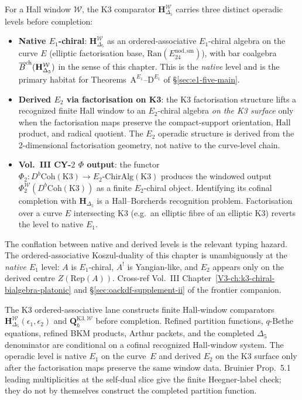 \begin{remark}
\label{rem:v2-oackd-eone-etwo-scope}
For a Hall window $\mathcal W$, the K3 comparator
$\mathbf H_{\Delta_5}^{\mathcal W}$ carries three distinct operadic
levels before completion:
\begin{itemize}
\item \textbf{Native $E_1$-chiral}: $\mathbf H_{\Delta_5}^{\mathcal W}$ as an
 ordered-associative $E_1$-chiral algebra on the curve $E$ (elliptic
 factorisation base, $\mathrm{Ran}(E^{\mathrm{nod,sm}}_{24})$), with
 bar coalgebra $\overline{B}^{\mathrm{ch}}(\mathbf H_{\Delta_5}^{\mathcal W})$ in the sense of this
 chapter. This is the \emph{native} level and is the primary habitat
 for Theorems~$\mathrm A^{E_1}$--$\mathrm D^{E_1}$ of
 \S\ref{sec:e1-five-main}.
\item \textbf{Derived $E_2$ via factorisation on K3}: the K3 factorisation
 structure lifts a recognized finite Hall window to an $E_2$-chiral
 algebra \emph{on the K3 surface} only when the factorisation maps
 preserve the compact-support orientation, Hall product, and radical
 quotient. The $E_2$ operadic structure is derived from the
 2-dimensional factorisation geometry, not native to the curve-level
 chain.
\item \textbf{Vol.~III CY-$2$ $\Phi$ output}: the functor
 $\Phi_2 : D^b\mathrm{Coh}(\mathrm{K3}) \to E_2\text{-}\mathrm{ChirAlg}(\mathrm{K3})$
 produces the windowed output
 $\Phi_2^{\mathcal W}(D^b\mathrm{Coh}(\mathrm{K3}))$ as a finite
 $E_2$-chiral object.  Identifying its cofinal completion with
 $\mathbf H_{\Delta_5}$ is a Hall--Borcherds recognition problem.
 Factorisation over a curve $E$ intersecting K3 (e.g.\ an elliptic
 fibre of an elliptic K3) reverts the level to native $E_1$.
\end{itemize}
The conflation between native and derived levels is the relevant
typing hazard. The ordered-associative Koszul-duality of this chapter
is unambiguously at the \emph{native
$E_1$} level: $A$ is $E_1$-chiral, $A^!$ is Yangian-like, and $E_2$
appears only on the derived centre $Z(\mathrm{Rep}(A))$. Cross-ref
Vol.~III Chapter~\ref{V3-ch:k3-chiral-bialgebra-platonic} and
\S\ref{sec:oackdf-supplement-ii} of the frontier companion.
\end{remark}

\begin{remark}[Summary]
\label{rem:v2-oackd-refined-summary}
The K3 ordered-associative lane constructs finite Hall-window
comparators
$\mathbf H_{\Delta_5}^{\mathcal W}(\epsilon_1,\epsilon_2)$ and
$\mathbf Q_{\hbar}^{\mathrm{K3},\mathcal W}$ before completion.  Refined
partition functions, $q$-Bethe equations, refined BKM products, Arthur
packets, and the completed $\Delta_5$ denominator are conditional on a
cofinal recognized Hall-window system. The operadic level is native
$E_1$ on the curve~$E$ and derived $E_2$ on the K3 surface only after
the factorisation maps preserve the same window data. Bruinier
Prop.~5.1 leading multiplicities at the self-dual slice give the finite
Heegner-label check; they do not by themselves construct the completed
partition function.
\end{remark}
